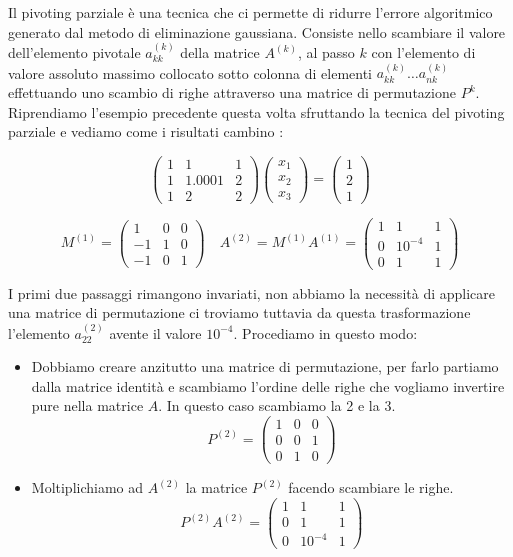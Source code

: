 \documentclass[12pt, a4paper]{book}
\theoremstyle{definition}
\begin{document}
\begin{flushleft}
Il pivoting parziale è una tecnica che ci permette di ridurre l'errore algoritmico generato dal metodo di eliminazione gaussiana.
Consiste nello scambiare il valore dell'elemento pivotale $a^{(k)}_{kk}$ della matrice $A^{(k)}$, al passo $k$ con l'elemento di valore assoluto massimo collocato sotto colonna  di elementi $a^{(k)}_{kk} \dots a^{(k)}_{nk}$ effettuando uno scambio di righe attraverso una matrice di permutazione $P^{k}$. \\
\vspace{1em}
Riprendiamo l'esempio precedente questa volta sfruttando la tecnica del pivoting parziale e vediamo come i risultati cambino : 

\[ 	
	\begin{pmatrix}
		 1 & 1 & 1 \\
		 1 & 1.0001 & 2 \\
		 1 & 2 & 2 
	\end{pmatrix}
	\begin{pmatrix}
		x_{1} \\
		x_{2} \\
		x_{3}
	\end{pmatrix}
	= 
	\begin{pmatrix}
		1 \\
		2 \\
		1
	\end{pmatrix}
\]

\[ 	
	M^{(1)} = 
	\begin{pmatrix}
		 1 & 0 & 0 \\
		 -1 & 1 & 0 \\
		 -1 & 0 & 1 
	\end{pmatrix}
	\quad
	A^{(2)} = M^{(1)}A^{(1)}= 
	\begin{pmatrix}
		 1 & 1 & 1 \\
		 0 & 10^{-4} & 1 \\
		 0 & 1 & 1 
	\end{pmatrix}	
\]

I primi due passaggi rimangono invariati, non abbiamo la necessità di applicare una matrice di permutazione ci troviamo tuttavia da questa trasformazione l'elemento $a^{(2)}_{22}$ avente il valore $10^{-4}$.
Procediamo in questo modo:
\begin{itemize}
	\item Dobbiamo creare anzitutto una matrice di permutazione, per farlo partiamo dalla matrice identità e scambiamo l'ordine delle righe che vogliamo invertire pure nella matrice $A$.  In questo caso scambiamo la 2 e la 3.
	\[ 
		P^{(2)} = 
		\begin{pmatrix}
		 1 & 0 & 0 \\
		 0 & 0 & 1 \\
		 0 & 1 & 0 
		\end{pmatrix}	
	\]
	\item Moltiplichiamo ad $A^{(2)}$ la matrice $P^{(2)}$ facendo scambiare le righe.
	\[ 
		P^{(2)}A^{(2)} = 
		\begin{pmatrix}
		 1 & 1 & 1 \\
		 0 & 1 & 1 \\
		 0 & 10^{-4} & 1 
		\end{pmatrix}
	\]
\end{itemize}


\end{flushleft}
\end{document}
